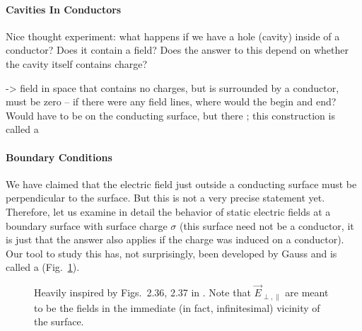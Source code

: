 \documentclass[../class_mech_main.tex]{subfiles}
\begin{document}
            \paragraph{Cavities In Conductors}
Nice thought experiment: what happens if we have a hole (cavity) inside of a conductor? Does it contain a field? Does the answer to this depend on whether the cavity itself contains charge?

-> field in space that contains no charges, but is surrounded by a conductor, must be zero -- if there were any field lines, where would the begin and end? Would have to be on the conducting surface, but there ; this construction is called a 



            \paragraph{Boundary Conditions}
We have claimed that the electric field just outside a conducting surface must be perpendicular to the surface. But this is not a very precise statement yet. Therefore, let us examine in detail the behavior of static electric fields at a boundary surface with surface charge $\sigma$ (this surface need not be a conductor, it is just that the answer also applies if the charge was induced on a conductor). Our tool to study this has, not surprisingly, been developed by Gauss and is called a  (Fig.~\ref{fig:gaussian_pillow}).



\begin{figure}
    \centering

    \hspace*{0.1\textwidth}%

    \caption{Heavily inspired by Figs.~2.36, 2.37 in \cite{Griffiths_2017}. Note that $\vec{E}_{\perp, \parallel}$ are meant to be the fields in the immediate (in fact, infinitesimal) vicinity of the surface.}
    \label{fig:gaussian_pillow}
\end{figure}
\end{document}
